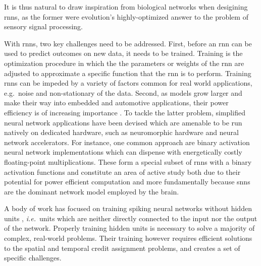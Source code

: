 \documentclass[journal,onecolumn,11pt]{IEEEtran}
\begin{document}
It is thus natural to draw inspiration from biological networks when desigining \glspl{rnn}, as the former were evolution's highly-optimized answer to the problem of sensory signal processing. 

With \glspl{rnn}, two key challenges need to be addressed. 
First, before an \gls{rnn} can be used to predict outcomes on new data, it needs to be trained.
Training is the optimization procedure in which the the parameters or weights of the \gls{rnn} are adjusted to approximate a specific function that the \gls{rnn} is to perform.
Training \glspl{rnn} can be impeded by a variety of factors common for real world applications, e.g.\ noise and non-stationary of the data. 
Second, as models grow larger and make their way into embedded and automotive applications, their power efficiency is of increasing importance \cite{boahen_neuromorphs_2017}. 
To tackle the latter problem, simplified neural network applications have been devised which are amenable to be run natively on dedicated hardware, such as neuromorphic hardware and neural network accelerators.  
For instance, one common approach are binary activation neural network implementations which can dispense with energetically costly floating-point multiplications. %
These form a special subset of \glspl{rnn} with a binary activation functions and constitute an area of active study both due to their potential for power
efficient computation and more fundamentally because \glspl{snn} are the dominant network model employed by the brain.

A body of work has focused on training spiking neural networks without hidden units \cite{ponulak_supervised_2009, Gutig_Sompolinsky06_tempneur,
florian_chronotron:_2012, mohemmed_span:_2012, memmesheimer_learning_2014, Anwani_Rajendran15_normappr}, \emph{i.e.}\ units which are neither directly connected to the input nor the output of the network.  
Properly training hidden units is necessary to solve a majority of complex, real-world problems.
Their training however requires efficient solutions to the spatial and temporal credit assignment problems, and creates a set of specific challenges.  
\end{document}
